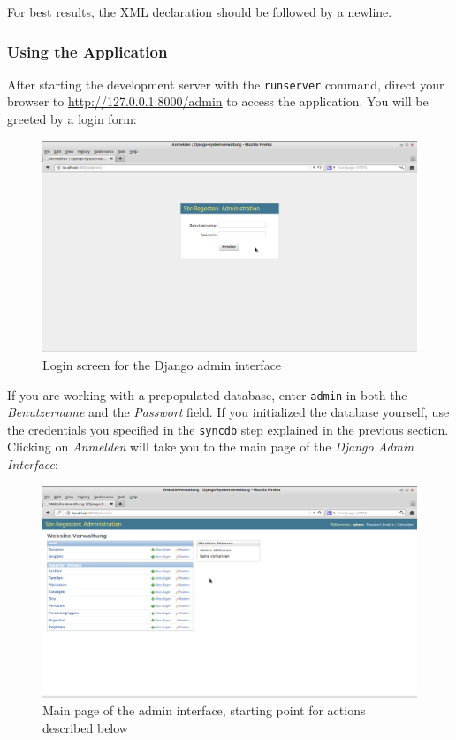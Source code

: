 For best results, the XML declaration should be followed by a newline.

\subsubsection{Using the Application}
\label{sec:use}

After starting the development server with the \texttt{runserver}
command, direct your browser to \url{http://127.0.0.1:8000/admin} to
access the application. You will be greeted by a login form:

\begin{figure}[h]
  \centering
  \includegraphics[scale=0.3]{img/admin-login}
  \caption{Login screen for the Django admin interface}
  \label{fig:admin-login}
\end{figure}

If you are working with a prepopulated database, enter \texttt{admin}
in both the \emph{Benutzername} and the \emph{Passwort} field. If you
initialized the database yourself, use the credentials you specified
in the \texttt{syncdb} step explained in the previous section.
Clicking on \emph{Anmelden} will take you to the main page of the
\emph{Django Admin Interface}:

\begin{figure}[h]
  \centering
  \includegraphics[scale=0.3]{img/admin-main}
  \caption{Main page of the admin interface, starting point for actions described below}
  \label{fig:admin-main}
\end{figure}

